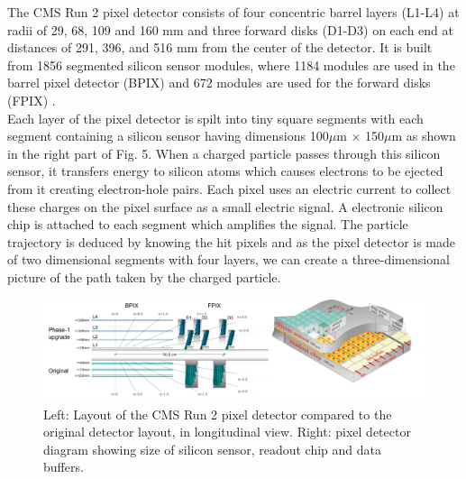 The CMS Run 2 pixel detector consists of four concentric barrel layers (L1-L4) at radii of 29, 68, 109 and 160 mm and three forward disks (D1-D3) on each end at distances of 291, 396, and 516 mm from the center of the detector. It is built from 1856 segmented silicon sensor modules, where 1184 modules are used in the barrel pixel detector (BPIX) and 672 modules are used for the forward disks (FPIX) . \\

Each layer of the pixel detector is spilt into tiny square segments with each segment containing a silicon sensor having dimensions 100$\mu$m $\times$ 150$\mu$m as shown in the right part of Fig. 5. When a charged particle passes through this silicon sensor, it transfers energy to silicon atoms which causes electrons to be ejected from it creating electron-hole pairs. Each pixel uses an electric current to collect these charges on the pixel surface as a small electric signal. A electronic silicon chip is attached to each segment which amplifies the signal. The particle trajectory is deduced by knowing the hit pixels and as the pixel detector is made of two dimensional segments with four layers, we can create a three-dimensional picture of the path taken by the charged particle.



\begin{figure}[H]
  \centering
  \includegraphics[width=1 \columnwidth]{./pixeldetector_merged1.png}
  \caption{ \onehalfspacing Left: Layout of the CMS Run 2 pixel detector compared to the original detector layout, in longitudinal view. Right: pixel detector diagram showing size of silicon sensor, readout chip and data buffers. \cite{TrackerGroupoftheCMS:2020bgg}}
  \label{fig:LHC}
\end{figure}


